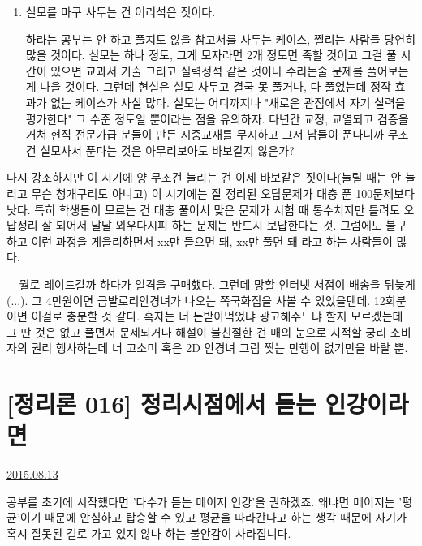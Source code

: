 \begin{enumerate}
    \item  실모를 마구 사두는 건 어리석은 짓이다.
    \vspace{5mm}
    
    하라는 공부는 안 하고 풀지도 않을 참고서를 사두는 케이스, 찔리는 사람들 당연히 많을 것이다.
    실모는 하나 정도, 그게 모자라면 2개 정도면 족할 것이고 그걸 풀 시간이 있으면
    교과서 기출 그리고 실력정석 같은 것이나 수리논술 문제를 풀어보는 게 나을 것이다.
    그런데 현실은 실모 사두고 결국 못 풀거나, 다 풀었는데 정작 효과가 없는 케이스가 사실 많다.
    실모는 어디까지나 "새로운 관점에서 자기 실력을 평가한다" 그 수준 정도일 뿐이라는 점을 유의하자.
    다년간 교정, 교열되고 검증을 거쳐 현직 전문가급 분들이 만든 시중교재를 무시하고
    그저 남들이 푼다니까 무조건 실모사서 푼다는 것은 아무리보아도 바보같지 않은가?
    \vspace{5mm}
\end{enumerate}

다시 강조하지만 이 시기에 양 무조건 늘리는 건 이제 바보같은 짓이다(늘릴 때는 안 늘리고 무슨 청개구리도 아니고)
이 시기에는 잘 정리된 오답문제가 대충 푼 100문제보다 낫다.
특히 학생들이 모르는 건
대충 풀어서 맞은 문제가 시험 때 통수치지만
틀려도 오답정리 잘 되어서 달달 외우다시피 하는 문제는 반드시 보답한다는 것.
그럼에도 불구하고 이런 과정을 게을리하면서 xx만 들으면 돼, xx만 풀면 돼 라고 하는 사람들이 많다.
\vspace{5mm}

+ 뭘로 레이드갈까 하다가 일격을 구매했다.
그런데 망할 인터넷 서점이 배송을 뒤늦게(...). 그 4만원이면 금발로리안경녀가 나오는 쪽국화집을 사볼 수 있었을텐데.
12회분이면 이걸로 충분할 것 같다.
혹자는 너 돈받아먹었냐 광고해주느냐 할지 모르겠는데 그 딴 것은 없고 풀면서 문제되거나 해설이 불친절한 건 매의 눈으로 지적할 궁리
소비자의 권리 행사하는데 너 고소미 혹은 2D 안경녀 그림 찢는 만행이 없기만을 바랄 뿐.
\vspace{5mm}

    
    
    
    





\section{[정리론 016] 정리시점에서 듣는 인강이라면}
\href{https://www.kockoc.com/Apoc/248225}{2015.08.13}

\vspace{5mm}

공부를 초기에 시작했다면 '다수가 듣는 메이저 인강'을 권하겠죠.
왜냐면 메이저는 '평균'이기 때문에 안심하고 탑승할 수 있고
평균을 따라간다고 하는 생각 때문에 자기가 혹시 잘못된 길로 가고 있지 않나 하는 불안감이 사라집니다.
\vspace{5mm}

